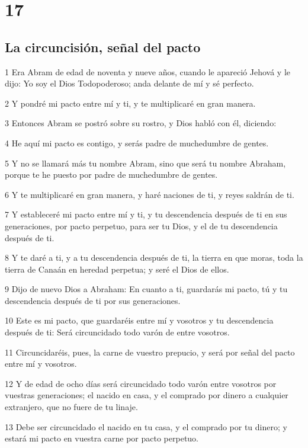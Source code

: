 \chapter{17}

\section*{La circuncisión, señal del pacto}

\par 1 Era Abram de edad de noventa y nueve años, cuando le apareció Jehová y le dijo: Yo soy el Dios Todopoderoso; anda delante de mí y sé perfecto.
\par 2 Y pondré mi pacto entre mí y ti, y te multiplicaré en gran manera.
\par 3 Entonces Abram se postró sobre su rostro, y Dios habló con él, diciendo:
\par 4 He aquí mi pacto es contigo, y serás padre de muchedumbre de gentes.
\par 5 Y no se llamará más tu nombre Abram, sino que será tu nombre Abraham, porque te he puesto por padre de muchedumbre de gentes.
\par 6 Y te multiplicaré en gran manera, y haré naciones de ti, y reyes saldrán de ti.
\par 7 Y estableceré mi pacto entre mí y ti, y tu descendencia después de ti en sus generaciones, por pacto perpetuo, para ser tu Dios, y el de tu descendencia después de ti.
\par 8 Y te daré a ti, y a tu descendencia después de ti, la tierra en que moras, toda la tierra de Canaán en heredad perpetua; y seré el Dios de ellos.
\par 9 Dijo de nuevo Dios a Abraham: En cuanto a ti, guardarás mi pacto, tú y tu descendencia después de ti por sus generaciones.
\par 10 Este es mi pacto, que guardaréis entre mí y vosotros y tu descendencia después de ti: Será circuncidado todo varón de entre vosotros.
\par 11 Circuncidaréis, pues, la carne de vuestro prepucio, y será por señal del pacto entre mí y vosotros.
\par 12 Y de edad de ocho días será circuncidado todo varón entre vosotros por vuestras generaciones; el nacido en casa, y el comprado por dinero a cualquier extranjero, que no fuere de tu linaje.
\par 13 Debe ser circuncidado el nacido en tu casa, y el comprado por tu dinero; y estará mi pacto en vuestra carne por pacto perpetuo.
